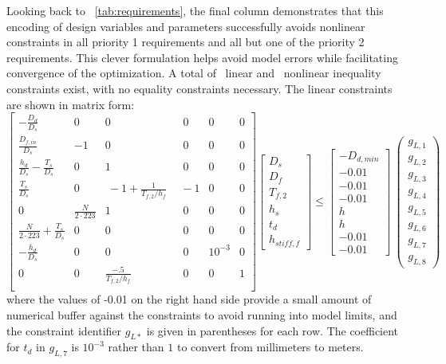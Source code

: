 Looking back to \tablename~\ref{tab:requirements}, the final column demonstrates that this encoding of design variables and parameters successfully avoids nonlinear constraints in all priority 1 requirements and all but one of the priority 2 requirements.
This clever formulation helps avoid model errors while facilitating convergence of the optimization.
A total of \numLinConstraints~linear and \numNonlinConstraints~nonlinear inequality constraints exist, with no equality constraints necessary.
The linear constraints are shown in matrix form:
\begin{equation}
    \begin{bmatrix}
    -\frac{D_d}{D_s} & 0 & 0 & ~~~0 & 0 & 0\\
    \frac{D_{f,in}}{D_s} & -1 & 0 & ~~~0& 0  & 0\\
    \frac{h_d}{D_s}-\frac{T_s}{D_s} & 0 & 1 & ~~~0& 0  & 0\\
    \frac{T_s}{D_s} & 0 & ~-1+\frac{1}{T_{f,2}/h_f} & ~~-1 & 0 & 0\\
    0 & \frac{N}{2\cdot223} & 1 & ~~~0& 0  & 0\\
    \frac{N}{2\cdot223}  + \frac{T_s}{D_s} & 0 & 0 & ~~~0 & 0 & 0\\
    -\frac{h_d}{D_s} & 0 & 0 & ~~~0 & 10^{-3} & 0\\
    0 & 0 & \frac{-.5}{T_{f,2}/h_f} & ~~~0 & 0 & 1 \\
    \end{bmatrix}
    \begin{bmatrix} D_s \\ D_f \\ T_{f,2} \\ h_s \\ t_d \\ h_{stiff,f}
    \end{bmatrix}
    \leq
    \begin{bmatrix}
    -D_{d,min} \\ -0.01 \\ -0.01 \\ -0.01 \\ h \\ h \\ -0.01 \\ -0.01
    \end{bmatrix}~
    \begin{pmatrix}
    g_{L,1} \\ g_{L,2} \\ g_{L,3} \\g_{L,4} \\ g_{L,5} \\ g_{L,6} \\ g_{L,7} \\ g_{L,8}
    \end{pmatrix}
\end{equation}
where the values of -0.01 on the right hand side provide a small amount of numerical buffer against the constraints to avoid running into model limits, and the constraint identifier $g_{L*}$ is given in parentheses for each row.
The coefficient for $t_d$ in $g_{L,7}$ is $10^{-3}$ rather than $1$ to convert from millimeters to meters.

